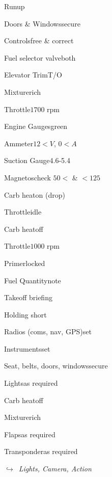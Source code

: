 \begin{multicols}{2}
\begin{checklist}{Runup}
    \item{Doors \& Windows}{secure}
    \item{Controls}{free \& correct}
    \item{Fuel selector valve}{both}
    \item{Elevator Trim}{T/O}
    \item{Mixture}{rich}
    \item{Throttle}{$1700$ rpm}
    \item{Engine Gauges}{green}
    \item{Ammeter}{$12<V$, $0<A$}
    \item{Suction Gauge}{4.6-5.4}
    \item{Magnetos}{check $50<$ \& $<125$}
    \item{Carb heat}{on (drop)}
    \item{Throttle}{idle}
    \item{Carb heat}{off}
    \item{Throttle}{$1000$ rpm}
    \item{Primer}{locked}
    \item{Fuel Quantity}{note}
\end{checklist}

\begin{checklist}{Takeoff briefing}
\end{checklist}

\begin{checklist}{Holding short}
    \item{Radios (coms, nav, GPS)}{set}
    \item{Instruments}{set}
    \item{Seat, belts, doors, windows}{secure}
    \item{Lights}{as required}
    \item{Carb heat}{off}
    \item{Mixture}{rich}
    \item{Flaps}{as required}
    \item{Transponder}{as required}
\end{checklist}

\noindent$\hookrightarrow$\ \textit{Lights, Camera, Action}

\end{multicols}

